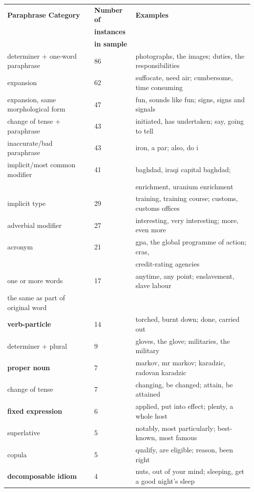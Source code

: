 \documentclass[11pt]{article}
\begin{document}
\begin{center}
\begin{table}
\hfill{}
\begin{tabular}{|l|l|l|}
\hline
\bf Paraphrase Category & \bf Number of & \bf Examples \\ 
 & \bf instances & \\
 & \bf in sample & \\ 
\hline
determiner + one-word paraphrase & 86 & photographs, the images; duties, the responsibilities \\
expansion & 62 & suffocate, need air; cumbersome, time consuming \\
expansion, same morphological form & 47 & fun, sounds like fun; signs, signs and signals \\
change of tense + paraphrase & 43 & initiated, has undertaken; say, going to tell \\
inaccurate/bad paraphrase & 43 & iron, a par; also, do i\\
implicit/most common modifier & 41 & baghdad, iraqi capital baghdad; \\
&& enrichment, uranium enrichment \\
implicit type & 29 & training, training course; customs, customs offices \\
adverbial modifier& 27 & interesting, very interesting; more, even more \\
acronym & 21 & gpa, the global programme of action; cras, \\
&& credit-rating agencies \\
one or more words  & 17 &  anytime, any point; enslavement, slave labour \\
the same as part of original word & &\\
\bf verb-particle & 14  & torched, burnt down; done, carried out\\
determiner + plural & 9 & gloves, the glove; militaries, the military\\
\bf proper noun & 7 & markov, mr markov; karadzic, radovan karadzic\\
change of tense & 7 & changing, be changed; attain, be attained\\
\bf fixed expression & 6 & applied, put into effect; plenty, a whole host \\
superlative & 5 & notably, most particularly; best-known, most famous\\
copula & 5 & qualify, are eligible; reason, been right \\
\bf decomposable idiom & 4 & nuts, out of your mind; sleeping, get a good night's sleep\\

\end{tabular}
\end{table}
\end{center}
\end{document}

